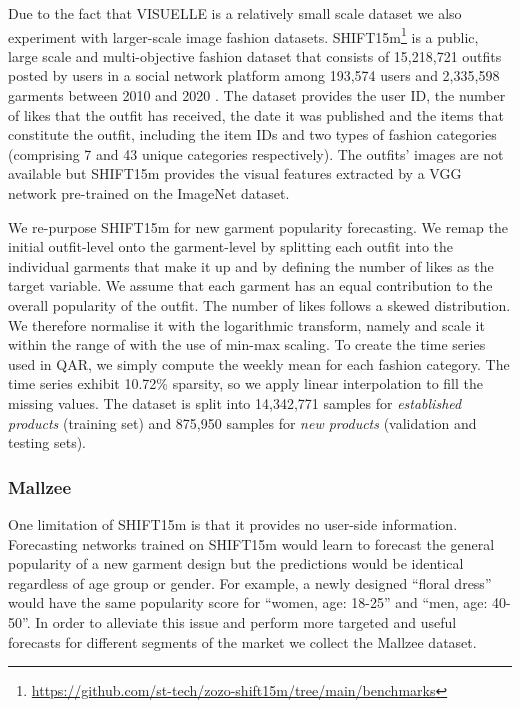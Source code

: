 \documentclass{article}
\begin{document}
Due to the fact that VISUELLE is a relatively small scale dataset we also experiment with larger-scale image fashion datasets.
SHIFT15m\footnote{\url{https://github.com/st-tech/zozo-shift15m/tree/main/benchmarks}} is a public, large scale and multi-objective fashion dataset that consists of 15,218,721 outfits posted by users in a social network platform among 193,574 users and 2,335,598 garments between 2010 and 2020 \cite{kimura2021shift15m}. The dataset provides the user ID, the number of likes that the outfit has received, the date it was published and the items that constitute the outfit, including the item IDs and two types of fashion categories (comprising 7 and 43 unique categories respectively). The outfits' images are not available but SHIFT15m provides the visual features extracted by a VGG network pre-trained on the ImageNet dataset.

We re-purpose SHIFT15m for new garment popularity forecasting. We remap the initial outfit-level onto the garment-level by splitting each outfit into the individual garments that make it up and by defining the number of likes as the target variable. We assume that each garment has an equal contribution to the overall popularity of the outfit.
The number of likes follows a skewed distribution. We therefore normalise it with the logarithmic transform, namely  and scale it within the range of  with the use of min-max scaling. 
To create the time series used in QAR, we simply compute the weekly mean for each fashion category. The time series exhibit 10.72\% sparsity, so we apply linear interpolation to fill the missing values.
The dataset is split into 14,342,771 samples for \textit{established products} (training set) and 875,950 samples for \textit{new products} (validation and testing sets).

\subsubsection{\textbf{Mallzee}}
One limitation of SHIFT15m is that it provides no user-side information. Forecasting networks trained on SHIFT15m would learn to forecast the general popularity of a new garment design but the predictions would be identical regardless of age group or gender. For example, a newly designed ``floral dress'' would have the same popularity score for ``women, age: 18-25'' and ``men, age: 40-50''. 
In order to alleviate this issue and perform more targeted and useful forecasts for different segments of the market we collect the Mallzee dataset.
\end{document}
